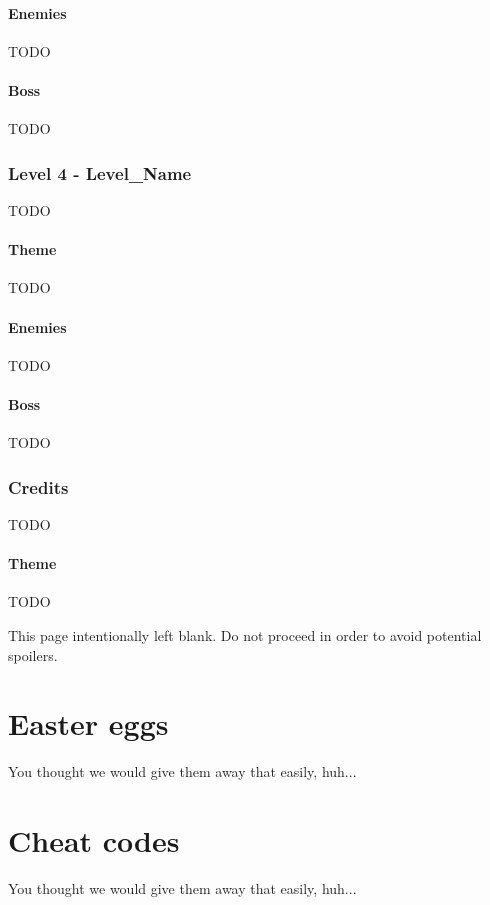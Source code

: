 \paragraph{Enemies}
TODO
\paragraph{Boss}
TODO

\subsubsection{Level 4 - Level\_Name}
TODO
\paragraph{Theme}
TODO
\paragraph{Enemies}
TODO
\paragraph{Boss}
TODO

\subsubsection{Credits}
TODO
\paragraph{Theme}
TODO


\clearpage
\vspace*{\fill}
\begin{center}
    \begin{minipage}{.6\textwidth}
        This page intentionally left blank. \newline \newline Do not proceed in order to avoid potential spoilers.
    \end{minipage}
\end{center}
\vfill %
\clearpage

\section{Easter eggs}
You thought we would give them away that easily, huh...
\section{Cheat codes}
You thought we would give them away that easily, huh...